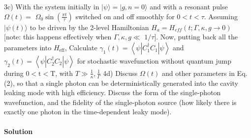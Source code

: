 \documentclass[hyperref, a4paper]{article}
\begin{document}
3c) With the system initially in $|\psi\rangle=|g, n=0\rangle$ and with a resonant pulse $\Omega(t)=$ $\Omega_{0} \sin \left(\frac{\pi t}{\tau}\right)$ switched on and off smoothly for $0<t<\tau$. Assuming $|\psi(t)\rangle$ to be driven by the 2-level Hamiltonian $H_{a}=H_{e f f}(t ; \Gamma, \kappa, g \rightarrow 0) \quad$ [note: this happens effectively when $\Gamma, \kappa, g \ll$ $1 / \tau]$. Now, putting back all the parameters into $H_\text{eff}$, Calculate $\gamma_{1}(t)=\left\langle\psi\left|C_{1}^{\dagger} C_{1}\right| \psi\right\rangle$ and $\gamma_{2}(t)=\left\langle\psi\left|C_{2}^{\dagger} C_{2}\right| \psi\right\rangle$ for stochastic wavefunction without quantum jump during $0<\mathrm{t}<\mathrm{T}$, with $T \gg \frac{1}{\kappa}, \frac{1}{\Gamma}$
4d) Discuss $\Omega(t)$ and other parameters in Eq. (2), so that a single photon can be deterministically generated into the cavity leaking mode with high efficiency. Discuss the form of the single-photon wavefunction, and the fidelity of the single-photon source (how likely there is exactly one photon in the time-dependent leaky mode).

\paragraph{Solution}
\end{document}
